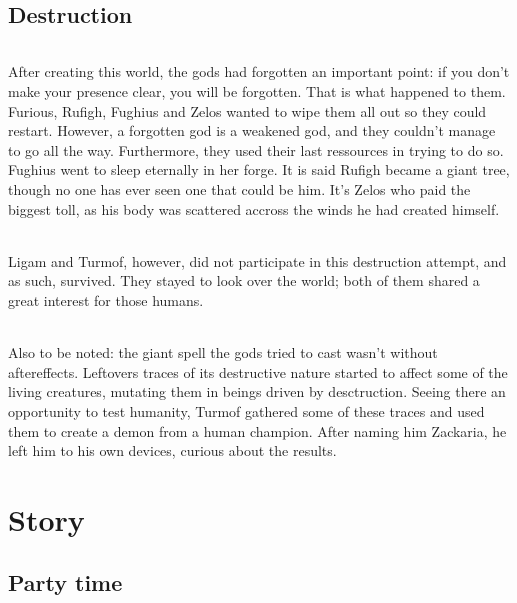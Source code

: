 \documentclass[a4paper,12pt]{book}
\begin{document}
		\chapter{Destruction}
			\paragraph{} After creating this world, the gods had forgotten an important point: if you don't make your presence clear, you will be forgotten. That is what happened to them. Furious, Rufigh, Fughius and Zelos wanted to wipe them all out so they could restart. However, a forgotten god is a weakened god, and they couldn't manage to go all the way. Furthermore, they used their last ressources in trying to do so. Fughius went to sleep eternally in her forge. It is said Rufigh became a giant tree, though no one has ever seen one that could be him. It's Zelos who paid the biggest toll, as his body was scattered accross the winds he had created himself.
			\paragraph{} Ligam and Turmof, however, did not participate in this destruction attempt, and as such, survived. They stayed to look over the world; both of them shared a great interest for those humans.
			\paragraph{} Also to be noted: the giant spell the gods tried to cast wasn't without aftereffects. Leftovers traces of its destructive nature started to affect some of the living creatures, mutating them in beings driven by desctruction. Seeing there an opportunity to test humanity, Turmof gathered some of these traces and used them to create a demon from a human champion. After naming him Zackaria, he left him to his own devices, curious about the results.
	\part{Story}
		\chapter{Party time}
\end{document}
